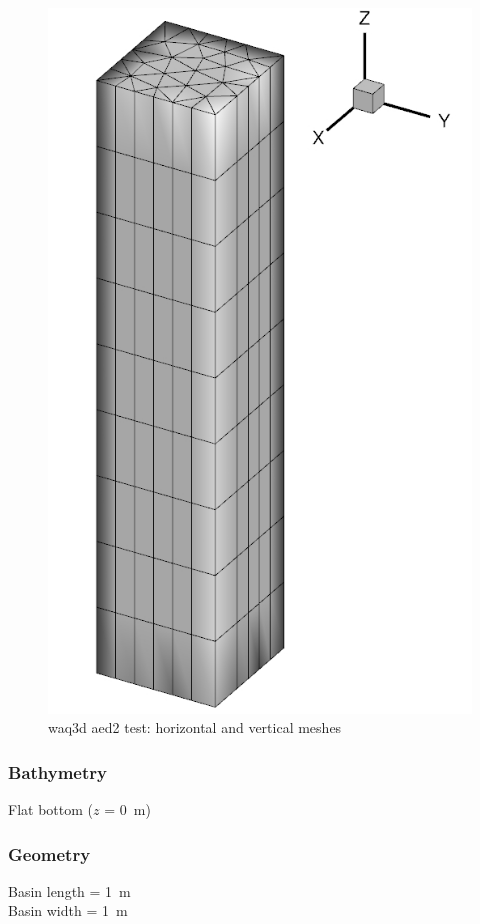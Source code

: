 \begin{figure} [H]
\centering
\includegraphics[scale=0.4]{mesh_waq3d-aed2.jpg}
 \caption{waq3d aed2 test: horizontal and vertical meshes}
 \label{fig:mesh}
\end{figure}
%
\subsubsection{Bathymetry}
%
Flat bottom ($z$ = 0~m)
%
\subsubsection{Geometry}
%
Basin length = 1~m\\
Basin width = 1~m
%
